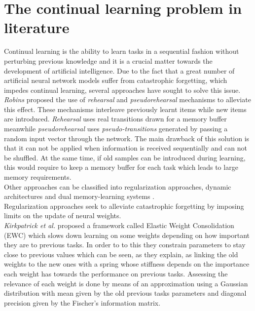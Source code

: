 \documentclass{article}
\begin{document}
\section{The continual learning problem in literature}
Continual learning is the ability to learn tasks in a sequential fashion without perturbing previous knowledge and it is a crucial matter towards the development of artificial intelligence. Due to the fact that a great number of artificial neural network models suffer from catastrophic forgetting, which impedes continual learning, several approaches have sought to solve this issue.\\
\newline
\textit{Robins} \citep{RobinsConsolidationBrain} proposed the use of \textit{rehearsal} and \textit{pseudorehearsal} mechanisms to alleviate this effect. These mechanisms interleave previously learnt items while new items are introduced. \textit{Rehearsal} uses real transitions drawn for a memory buffer meanwhile \textit{pseudorehearsal} uses \textit{pseudo-transitions} generated by passing a random input vector through the network. The main drawback of this solution is that it can not be applied when information is received sequentially and can not be shuffled. At the same time, if old samples can be introduced during learning, this would require to keep a memory buffer for each task which leads to large memory requirements.\\
Other approaches can be classified into regularization approaches, dynamic architectures and dual memory-learning systems \citep{Parisi2018ContinualReview}.\\
Regularization approaches seek to alleviate catastrophic forgetting by imposing limits on the update of neural weights.\\ \textit{Kirkpatrick et al.} \citep{Kirkpatrick2017OvercomingNetworks.} proposed a framework called Elastic Weight Consolidation (EWC) which slows down learning on some weights depending on how important they are to previous tasks. In order to to this they constrain parameters to stay close to previous values which can be seen, as they explain, as linking the old weights to the new ones with a spring whose stiffness depends on the importance each weight has towards the performance on previous tasks. Assessing the relevance of each weight is done by means of an approximation using a Gaussian distribution with mean given by the old previous tasks parameters and diagonal precision given by the Fischer's information matrix.
\end{document}
